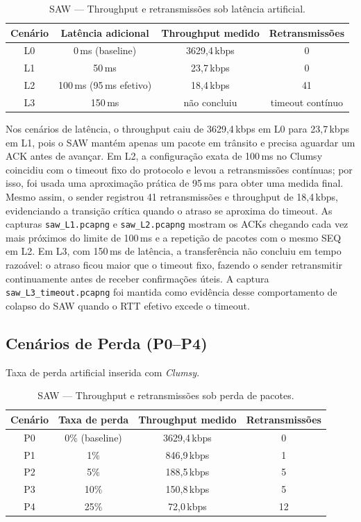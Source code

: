 \documentclass[10pt,a4paper]{article}
\begin{document}
\begin{table}[H]
\centering
\caption{SAW — Throughput e retransmissões sob latência artificial.}
\label{tab:latencia_saw}
\begin{tabular}{@{}cccc@{}}
\toprule
\textbf{Cenário} & \textbf{Latência adicional} & \textbf{Throughput medido} & \textbf{Retransmissões} \\
\midrule
L0 & 0\,ms (baseline) & 3629{,}4\,kbps & 0 \\
L1 & 50\,ms            & 23{,}7\,kbps & 0 \\
L2 & 100\,ms (95\,ms efetivo) & 18{,}4\,kbps & 41 \\
L3 & 150\,ms           & não concluiu & timeout contínuo \\
\bottomrule
\end{tabular}
\end{table}

Nos cenários de latência, o throughput caiu de 3629{,}4\,kbps em L0 para
23{,}7\,kbps em L1, pois o SAW mantém apenas um pacote em trânsito e precisa
aguardar um ACK antes de avançar. Em L2, a configuração exata de 100\,ms no
Clumsy coincidiu com o timeout fixo do protocolo e levou a retransmissões
contínuas; por isso, foi usada uma aproximação prática de 95\,ms para obter uma
medida final. Mesmo assim, o sender registrou 41 retransmissões e throughput de
18{,}4\,kbps, evidenciando a transição crítica quando o atraso se aproxima do
timeout. As capturas \texttt{saw\_L1.pcapng} e \texttt{saw\_L2.pcapng} mostram
os ACKs chegando cada vez mais próximos do limite de 100\,ms e a repetição de
pacotes com o mesmo SEQ em L2. Em L3, com 150\,ms de latência, a transferência
não concluiu em tempo razoável: o atraso ficou maior que o timeout fixo, fazendo
o sender retransmitir continuamente antes de receber confirmações úteis. A
captura \texttt{saw\_L3\_timeout.pcapng} foi mantida como evidência desse
comportamento de colapso do SAW quando o RTT efetivo excede o timeout.

\subsection{Cenários de Perda (P0–P4)}

Taxa de perda artificial inserida com \textit{Clumsy}.

\begin{table}[H]
\centering
\caption{SAW — Throughput e retransmissões sob perda de pacotes.}
\label{tab:perda_saw}
\begin{tabular}{@{}cccc@{}}
\toprule
\textbf{Cenário} & \textbf{Taxa de perda} & \textbf{Throughput medido} & \textbf{Retransmissões} \\
\midrule
P0 & 0\%  (baseline) & 3629{,}4\,kbps & 0 \\
P1 & 1\%             & 846{,}9\,kbps & 1 \\
P2 & 5\%             & 188{,}5\,kbps & 5 \\
P3 & 10\%            & 150{,}8\,kbps & 5 \\
P4 & 25\%            & 72{,}0\,kbps & 12 \\
\bottomrule
\end{tabular}
\end{table}
\end{document}
